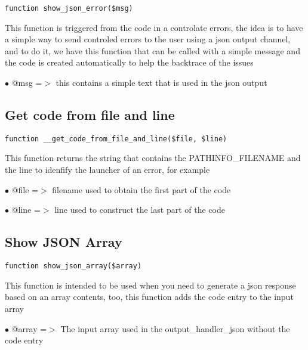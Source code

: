 \documentclass[a4paper]{book}
\begin{document}
\begin{lstlisting}
function show_json_error($msg)
\end{lstlisting}

This function is triggered from the code in a controlate errors, the idea is to have
a simple way to send controled errors to the user using a json output channel, and to
do it, we have this function that can be called with a simple message and the code
is created automatically to help the backtrace of the issues

\begin{compactitem}
\item[\color{myblue}$\bullet$] @msg =$>$ this contains a simple text that is used in the json output
\end{compactitem}

\hypertarget{toc113}{}
\subsection{Get code from file and line}

\begin{lstlisting}
function __get_code_from_file_and_line($file, $line)
\end{lstlisting}

This function returns the string that contains the PATHINFO\_FILENAME and the line to idenfify
the launcher of an error, for example

\begin{compactitem}
\item[\color{myblue}$\bullet$] @file =$>$ filename used to obtain the first part of the code
\item[\color{myblue}$\bullet$] @line =$>$ line used to construct the last part of the code
\end{compactitem}

\hypertarget{toc114}{}
\subsection{Show JSON Array}

\begin{lstlisting}
function show_json_array($array)
\end{lstlisting}

This function is intended to be used when you need to generate a json response based on
an array contents, too, this function adds the code entry to the input array

\begin{compactitem}
\item[\color{myblue}$\bullet$] @array =$>$ The input array used in the output\_handler\_json without the code entry
\end{compactitem}
\end{document}
